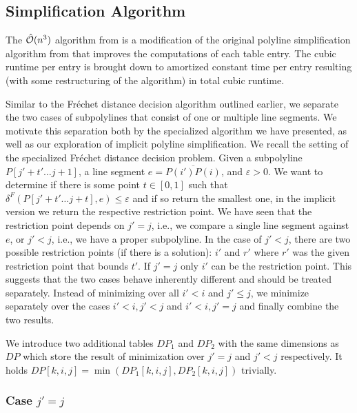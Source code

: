 \subsection{Simplification Algorithm}
\label{ssec:simplification_algo_cubic}

The \(\hat{\mathcal{O}}(n^3)\) algorithm from \citeauthor{polyline_simplification_has_cubic_complexity_bringmannetal} is a modification of the original polyline simplification algorithm from \citeauthor{on_optimal_polyline_simplification_using_the_hausdorff_and_frechet_distance} that improves the computations of each table entry. The cubic runtime per entry is brought down to amortized constant time per entry resulting (with some restructuring of the algorithm) in total cubic runtime. 

Similar to the Fréchet distance decision algorithm outlined earlier, we separate the two cases of subpolylines that consist of one or multiple line segments. We motivate this separation both by the specialized algorithm we have presented, as well as our exploration of implicit polyline simplification. We recall the setting of the specialized Fréchet distance decision problem. Given a subpolyline \(P[j' + t' \dots j + 1]\), a line segment \(e = \overline{P(i')P(i)}\), and \(\varepsilon > 0\). We want to determine if there is some point \(t \in [0, 1]\) such that \(\delta^F(P[j' + t' \dots j + t], e) \leq \varepsilon\) and if so return the smallest one, in the implicit version we return the respective restriction point. We have seen that the restriction point depends on \(j' = j\), i.e., we compare a single line segment against \(e\), or \(j' < j\), i.e., we have a proper subpolyline. 
In the case of \(j' < j\), there are two possible restriction points (if there is a solution): \(i'\) and \(r'\) where \(r'\) was the given restriction point that bounds \(t'\). If \(j' = j\) only \(i'\) can be the restriction point. This suggests that the two cases behave inherently different and should be treated separately. Instead of minimizing over all \(i' < i\) and \(j' \leq j\), we minimize separately over the cases \(i' < i, j' < j\) and \(i' < i, j' = j\) and finally combine the two results.

We introduce two additional tables \(DP_1\) and \(DP_2\) with the same dimensions as \(DP\) which store the result of minimization over \(j'=j\) and \(j' < j\) respectively. It holds \(DP[k, i, j] = \min(DP_1[k,i,j], DP_2[k,i,j])\) trivially. 

\subsubsection{Case \(j' = j\)}

